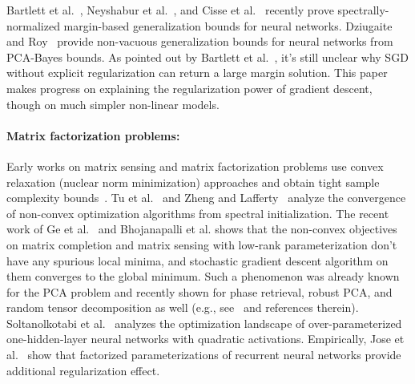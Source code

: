 Bartlett et al.~\cite{bartlett2017spectrally}, Neyshabur et al.~\cite{neyshabur2017pac}, and Cisse et al.~\cite{cisse2017parseval} recently prove spectrally-normalized margin-based generalization bounds for neural networks. Dziugaite and Roy~\cite{dziugaite2017computing} provide non-vacuous generalization bounds for neural networks from PCA-Bayes bounds. As pointed out by Bartlett et al.~\cite{bartlett2017spectrally}, it's still unclear why SGD without explicit regularization can return a large margin solution. This paper makes progress on explaining the regularization power of gradient descent, though on much simpler non-linear models. 


\paragraph{Matrix factorization problems: }
Early works on matrix sensing and matrix factorization problems use convex relaxation  (nuclear norm minimization) approaches and obtain tight sample complexity bounds~\cite{recht2010guaranteed, srebro2005rank,candes2009exact,recht2011simpler,candes2011robust}. Tu et al.~\cite{tu2015low} and Zheng and Lafferty~\cite{zheng2016convergence} analyze the convergence of non-convex optimization algorithms from spectral initialization. The recent work of Ge et al.~\cite{ge2016matrix} and Bhojanapalli et al. \cite{bhojanapalli2016personal}
shows that the non-convex objectives on matrix completion and matrix sensing with low-rank parameterization don't have any spurious local minima, and stochastic gradient descent algorithm on them converges to the global minimum. 
Such a phenomenon was already known for the PCA problem and recently shown for phase retrieval, robust PCA,
and random tensor decomposition as well (e.g., see~\cite{srebro2003weighted, ge2016matrix,bhojanapalli2016personal,ge2017no,ge2017on,sun2016phase} and references therein). 
Soltanolkotabi et al.~\cite{2017arXiv170704926S} analyzes the optimization landscape of over-parameterized one-hidden-layer neural networks with quadratic activations. 
Empirically, Jose et al.~\cite{jose2017kronecker} show that factorized parameterizations of recurrent neural networks provide additional regularization effect. %




